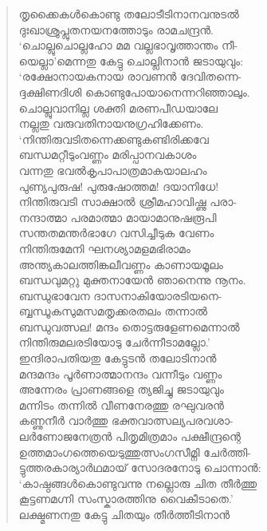 \begin{verse}
തൃക്കൈകള്‍കൊണ്ടു തലോടീടിനാനവനുടല്‍\\
ദുഃഖാശ്രുപ്ലുതനയനത്തോടും രാമചന്ദ്രന്‍.\\
‘ചൊല്ലുചൊല്ലഹോ മമ വല്ലഭാവൃത്താന്തം നീ-\\
യെല്ലാ’മെന്നതു കേട്ടു ചൊല്ലിനാന്‍ ജടായുവും:\\
‘രക്ഷോനായകനായ രാവണന്‍ ദേവിതന്നെ-\\
ദ്ദക്ഷിണദിശി കൊണ്ടുപോയാനെന്നറിഞ്ഞാലും.\\
ചൊല്ലുവാനില്ല ശക്തി മരണപീഡയാലേ\\
നല്ലതു വരുവതിനായനുഗ്രഹിക്കേണം.\\
‘നിന്തിരുവടിതന്നെക്കണ്ടുകണ്ടിരിക്കവേ\\
ബന്ധമറ്റീടുംവണ്ണം മരിപ്പാനവകാശം\\
വന്നതു ഭവല്‍കൃപാപാത്രമാകയാലഹം\\
പുണ്യപുരുഷ! പുരുഷോത്തമ! ദയാനിധേ!\\
നിന്തിരുവടി സാക്ഷാല്‍ ശ്രീമഹാവിഷ്ണു പരാ-\\
നന്ദാത്മാ പരമാത്മാ മായാമാനുഷരൂപി\\
സന്തതമന്തര്‍ഭാഗേ വസിച്ചീടുക വേണം\\
നിന്തിരുമേനി ഘനശ്യാമളമഭിരാമം\\
അന്ത്യകാലത്തിങ്കലീവണ്ണം കാണായമൂലം\\
ബന്ധവുമറ്റു മുക്തനായേന്‍ ഞാനെന്നു നൂനം.\\
ബന്ധുഭാവേന ദാസനാകിയോരടിയനെ-\\
ബ്ബന്ധൂകസുമസമതൃക്കരതലം തന്നാല്‍\\
ബന്ധുവത്സല! മന്ദം തൊട്ടരുളേണമെന്നാല്‍\\
നിന്തിരുമലരടിയോടു ചേര്‍ന്നീടാമല്ലോ.’\\
ഇന്ദിരാപതിയതു കേട്ടുടന്‍ തലോടിനാന്‍\\
മന്ദമന്ദം പൂര്‍ണാത്മാനന്ദം വന്നീടും വണ്ണം\\
അന്നേരം പ്രാണങ്ങളെ ത്യജിച്ചു ജടായുവും\\
മന്നിടം തന്നില്‍ വീണനേരത്തു രഘുവരന്‍\\
കണ്ണുനീര്‍ വാര്‍ത്തു ഭക്തവാത്സല്യപരവശാ-\\
ലര്‍ണോജനേത്രന്‍ പിതൃമിത്രമാം പക്ഷീന്ദ്രന്റെ\\
ഉത്തമാംഗത്തെയെടുത്തുത്സംഗസീമ്നി ചേര്‍ത്തി-\\
ട്ടുത്തരകാര്യാര്‍ഥമായ് സോദരനോടു ചൊന്നാന്‍:\\
‘കാഷ്ഠങ്ങള്‍കൊണ്ടുവന്നു നല്ലൊരു ചിത തീര്‍ത്തു\\
കൂട്ടണമഗ്നി സംസ്കാരത്തിനു വൈകീടാതെ.’\\
ലക്ഷ്മണനതു കേട്ടു ചിതയും തീര്‍ത്തീടിനാന്‍\\

\end{verse}

